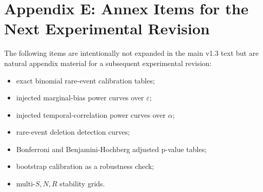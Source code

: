 \documentclass[11pt,a4paper]{article}
\begin{document}
\section{Appendix E: Annex Items for the Next Experimental Revision}

The following items are intentionally not expanded in the main v1.3 text but are natural appendix material for a subsequent experimental revision:
\begin{itemize}
  \item exact binomial rare-event calibration tables;
  \item injected marginal-bias power curves over $\varepsilon$;
  \item injected temporal-correlation power curves over $\alpha$;
  \item rare-event deletion detection curves;
  \item Bonferroni and Benjamini-Hochberg adjusted p-value tables;
  \item bootstrap calibration as a robustness check;
  \item multi-$S,N,R$ stability grids.
\end{itemize}
\end{document}
